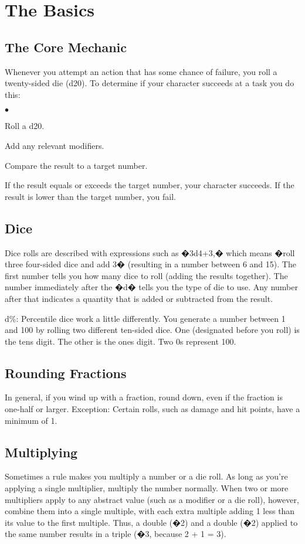 
\section{The Basics}

\subsection{The Core Mechanic}
Whenever you attempt an action that has some chance of failure, you roll a twenty-sided die (d20). To determine if your character succeeds at a task you do this:
\begin{list}{$\bullet$}{\itemspace}
	\item Roll a d20.
	\item Add any relevant modifiers.
	\item Compare the result to a target number.
\end{list}
If the result equals or exceeds the target number, your character succeeds. If the result is lower than the target number, you fail.

\subsection{Dice}
Dice rolls are described with expressions such as �3d4+3,� which means �roll three four-sided dice and add 3� (resulting in a number between 6 and 15). The first number tells you how many dice to roll (adding the results together). The number immediately after the �d� tells you the type of die to use. Any number after that indicates a quantity that is added or subtracted from the result.

d\%: Percentile dice work a little differently. You generate a number between 1 and 100 by rolling two different ten-sided dice. One (designated before you roll) is the tens digit. The other is the ones digit. Two 0s represent 100.

\subsection{Rounding Fractions}
In general, if you wind up with a fraction, round down, even if the fraction is one-half or larger.
Exception: Certain rolls, such as damage and hit points, have a minimum of 1.

\subsection{Multiplying}
Sometimes a rule makes you multiply a number or a die roll. As long as you're applying a single multiplier, multiply the number normally. When two or more multipliers apply to any abstract value (such as a modifier or a die roll), however, combine them into a single multiple, with each extra multiple adding 1 less than its value to the first multiple. Thus, a double (�2) and a double (�2) applied to the same number results in a triple (�3, because 2 + 1 = 3).

